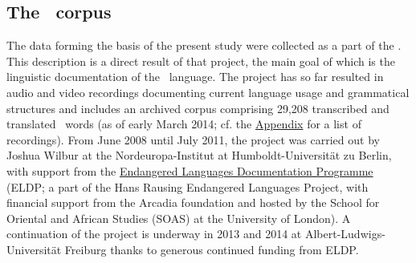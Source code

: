\subsection{The \PSDP\ corpus}\label{PSDPcorpus}
The data forming the basis of the present study were collected as a part of the \PSDP. This description is a direct result of that project, the main goal of which is the linguistic documentation of the \PS\ language. The project has so far resulted in audio and video recordings documenting current language usage and grammatical structures and includes an archived corpus comprising 29,208 transcribed and translated \PS\ words (as of early March 2014; %
cf. the \hyperlink{inventoryRef}{Appendix} for a list of recordings). 
From June 2008 until July 2011, the project was carried out by Joshua Wilbur at the Nordeuropa-Institut at Humboldt-Universität zu Berlin, with support from the \href{http://www.hrelp.org/grants/}{Endangered Languages Documentation Programme} (ELDP; a part of the Hans Rausing Endangered Languages Project, with financial support from the Arcadia foundation and hosted by the School for Oriental and African Studies (SOAS) at the University of London). %
A continuation of the project is underway in 2013 and 2014 at Albert-Ludwigs-Universität Freiburg thanks to generous continued funding from ELDP. 

